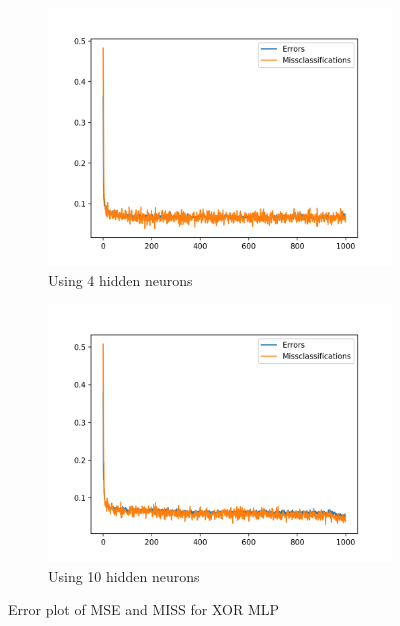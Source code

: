 \documentclass[12pt]{article}
\begin{document}
\begin{figure}[h!]
	\centering
	\begin{subfigure}{.49\linewidth}
	  \centering
	  \includegraphics[width=\linewidth]{img/sign1M4E.png}
	  \caption{Using 4 hidden neurons}
	  \label{fig:sign4}
	\end{subfigure}
	\begin{subfigure}{.49\linewidth}
	  \centering
	  \includegraphics[width=\linewidth]{img/sign1M10E.png}
	  \caption{Using 10 hidden neurons}
	  \label{fig:sign10}
	\end{subfigure}
	\caption{Error plot of MSE and MISS for XOR MLP}
	\label{fig:test}
\end{figure}
\end{document}
